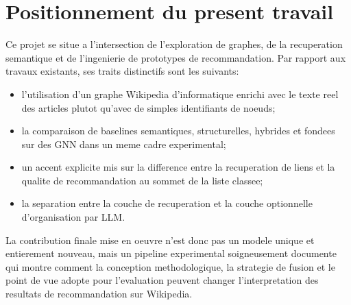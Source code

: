 \section{Positionnement du present travail}

Ce projet se situe a l'intersection de l'exploration de graphes, de la
recuperation semantique et de l'ingenierie de prototypes de recommandation. Par
rapport aux travaux existants, ses traits distinctifs sont les suivants:
\begin{itemize}
    \item l'utilisation d'un graphe Wikipedia d'informatique enrichi avec le
    texte reel des articles plutot qu'avec de simples identifiants de noeuds;
    \item la comparaison de baselines semantiques, structurelles, hybrides et
    fondees sur des GNN dans un meme cadre experimental;
    \item un accent explicite mis sur la difference entre la recuperation de
    liens et la qualite de recommandation au sommet de la liste classee;
    \item la separation entre la couche de recuperation et la couche optionnelle
    d'organisation par LLM.
\end{itemize}

La contribution finale mise en oeuvre n'est donc pas un modele unique et
entierement nouveau, mais un pipeline experimental soigneusement documente qui
montre comment la conception methodologique, la strategie de fusion et le point
de vue adopte pour l'evaluation peuvent changer l'interpretation des resultats
de recommandation sur Wikipedia.
